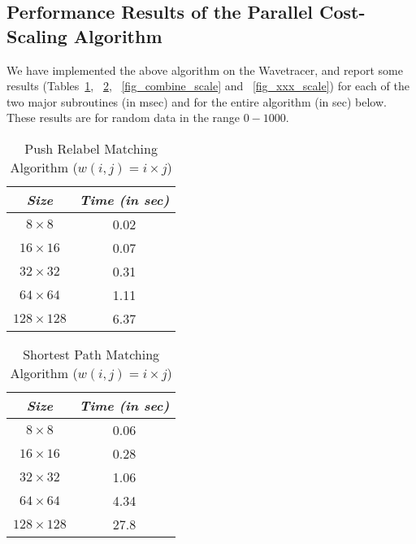 \subsection{Performance Results of the Parallel Cost-Scaling Algorithm}
\label{results_scale}

We have implemented the above algorithm on the Wavetracer, and 
report some results 
(Tables~\ref{fig_results_scale}, ~\ref{fig_distance_scale},
~\ref{fig_combine_scale} and ~\ref{fig_xxx_scale})
for each of the two major subroutines (in 
msec) and for the entire algorithm (in sec) below.  
These results are for random data in the range $0 - 1000$.

\begin{table}
\begin{center}
\begin{tabular}{|c|c|} \hline \hline
{\em Size }     & {\em Time (in sec)}  \\ \hline
$8 \times 8$	&   0.02	\\ \hline    
$16 \times 16$	&   0.07   	\\ \hline
$32 \times 32$	&   0.31  	\\ \hline
$64 \times 64$	&   1.11 	\\ \hline
$128 \times 128$&   6.37 	\\ \hline \hline 
\end{tabular}
\end{center}
\caption{Push Relabel Matching Algorithm ($w(i, j) = i \times j$)}
\label{fig_results_scale}
\end{table}

\begin{table}
\begin{center}
\begin{tabular}{|c|c|} \hline \hline
{\em Size }     & {\em Time (in sec)}  \\ \hline
$8 \times 8$	&    0.06	\\ \hline    
$16 \times 16$	&   0.28   	\\ \hline
$32 \times 32$	&   1.06  	\\ \hline
$64 \times 64$	&   4.34 	\\ \hline
$128 \times 128$&  27.8 	\\ \hline \hline 
\end{tabular}
\end{center}
\caption{Shortest Path Matching Algorithm ($w(i, j) = i \times j$)}
\label{fig_distance_scale}
\end{table}

